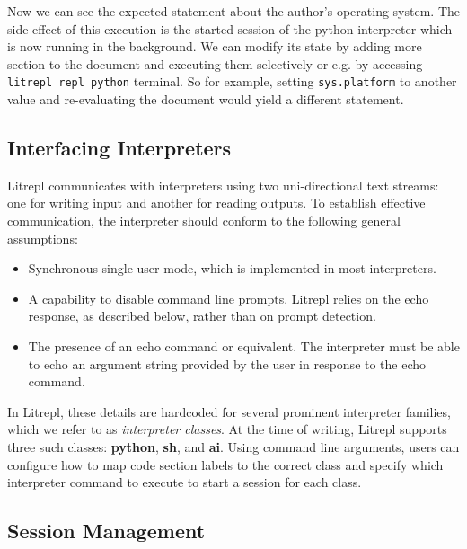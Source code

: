\documentclass[letterpaper,12pt,twocolumn]{article}
\begin{document}
Now we can see the expected statement about the author's operating system.  The
side-effect of this execution is the started session of the python interpreter
which is now running in the background. We can modify its state by adding more
section to the document and executing them selectively or e.g. by accessing
\verb|litrepl repl python| terminal. So for example, setting \verb|sys.platform|
to another value and re-evaluating the document would yield a different
statement.


\subsection{Interfacing Interpreters}

Litrepl communicates with interpreters using two uni-directional text streams:
one for writing input and another for reading outputs. To establish effective
communication, the interpreter should conform to the following general
assumptions:

\begin{itemize}
  \item Synchronous single-user mode, which is implemented in most interpreters.
  \item A capability to disable command line prompts. Litrepl relies on the echo
        response, as described below, rather than on prompt detection.
  \item The presence of an echo command or equivalent. The interpreter must be
        able to echo an argument string provided by the user in response to the
        echo command.
\end{itemize}

In Litrepl, these details are hardcoded for several prominent interpreter
families, which we refer to as \textit{interpreter classes}. At the time of
writing, Litrepl supports three such classes: \textbf{python}, \textbf{sh}, and
\textbf{ai}. Using command line arguments, users can configure how to map code
section labels to the correct class and specify which interpreter command to
execute to start a session for each class.

\subsection{Session Management}

\begin{comment}
\begin{sh}
echo -n '\begin' ; echo '{verbatim}'
echo '\begin{result}'
litrepl --python-auxdir=/tmp/litrepl/python restart python
{
cat <<EOF
import time
print('... some output ...')
time.sleep(9999)
EOF
}|litrepl --python-auxdir=/tmp/litrepl/python --timeout=1,inf eval-code python
echo '\end{result}'
echo -n '\end'; echo '{verbatim}'
\end{sh}
\end{comment}
\end{document}
